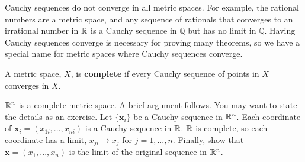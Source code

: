 Cauchy sequences do not converge in all metric spaces. For example,
the rational numbers are a metric space, and any sequence of rationals
that converges to an irrational number in $\mathbb{R}$ is a Cauchy sequence in
$\mathbb{Q}$ but has no limit in $\mathbb{Q}$. Having Cauchy sequences
converge is necessary for proving many theorems, so we have a special
name for metric spaces where Cauchy sequences converge.
\begin{definition}
  A metric space, $X$, is \textbf{complete} if every Cauchy sequence of
  points in $X$ converges in $X$.
\end{definition}
\begin{example}
  $\mathbb{R}^n$ is a complete metric space.  A brief argument follows. You
  may want to state the details as an exercise. Let $\{\mathbf{x}_i\}$
  be a Cauchy sequence in $\mathbb{R}^n$. Each coordinate of
  $\mathbf{x}_i = (x_{1i}, ... , x_{ni})$ is a Cauchy sequence in
  $\mathbb{R}$. $\mathbb{R}$ is complete, so each coordinate has a limit,
  $x_{ji} \to x_j$ for $j = 1, ..., n$. Finally, show that
  $\mathbf{x} = (x_1, ..., x_n)$ is the limit of the original sequence
  in $\mathbb{R}^n$.
\end{example}
